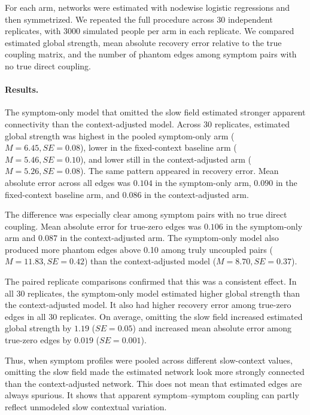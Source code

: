 For each arm, networks were estimated with nodewise logistic regressions and
then symmetrized. We repeated the full procedure across 30 independent
replicates, with 3000 simulated people per arm in each replicate. We compared
estimated global strength, mean absolute recovery error relative to the true
coupling matrix, and the number of phantom edges among symptom pairs with no
true direct coupling.

\paragraph{Results.}
The symptom-only model that omitted the slow field estimated stronger apparent
connectivity than the context-adjusted model. Across 30 replicates, estimated
global strength was highest in the pooled symptom-only arm
(\(M=6.45, SE=0.08\)), lower in the fixed-context baseline arm
(\(M=5.46, SE=0.10\)), and lower still in the context-adjusted arm
(\(M=5.26, SE=0.08\)). The same pattern appeared in recovery error. Mean
absolute error across all edges was \(0.104\) in the symptom-only arm,
\(0.090\) in the fixed-context baseline arm, and \(0.086\) in the
context-adjusted arm.

The difference was especially clear among symptom pairs with no true direct
coupling. Mean absolute error for true-zero edges was \(0.106\) in the
symptom-only arm and \(0.087\) in the context-adjusted arm. The symptom-only
model also produced more phantom edges above 0.10 among truly uncoupled pairs
(\(M=11.83, SE=0.42\)) than the context-adjusted model
(\(M=8.70, SE=0.37\)).

The paired replicate comparisons confirmed that this was a consistent effect.
In all 30 replicates, the symptom-only model estimated higher global strength
than the context-adjusted model. It also had higher recovery error among
true-zero edges in all 30 replicates. On average, omitting the slow field
increased estimated global strength by \(1.19\) (\(SE=0.05\)) and increased
mean absolute error among true-zero edges by \(0.019\) (\(SE=0.001\)).

Thus, when symptom profiles were pooled across different slow-context values,
omitting the slow field made the estimated network look more strongly connected
than the context-adjusted network. This does not mean that estimated edges are
always spurious. It shows that apparent symptom--symptom coupling can partly
reflect unmodeled slow contextual variation.

